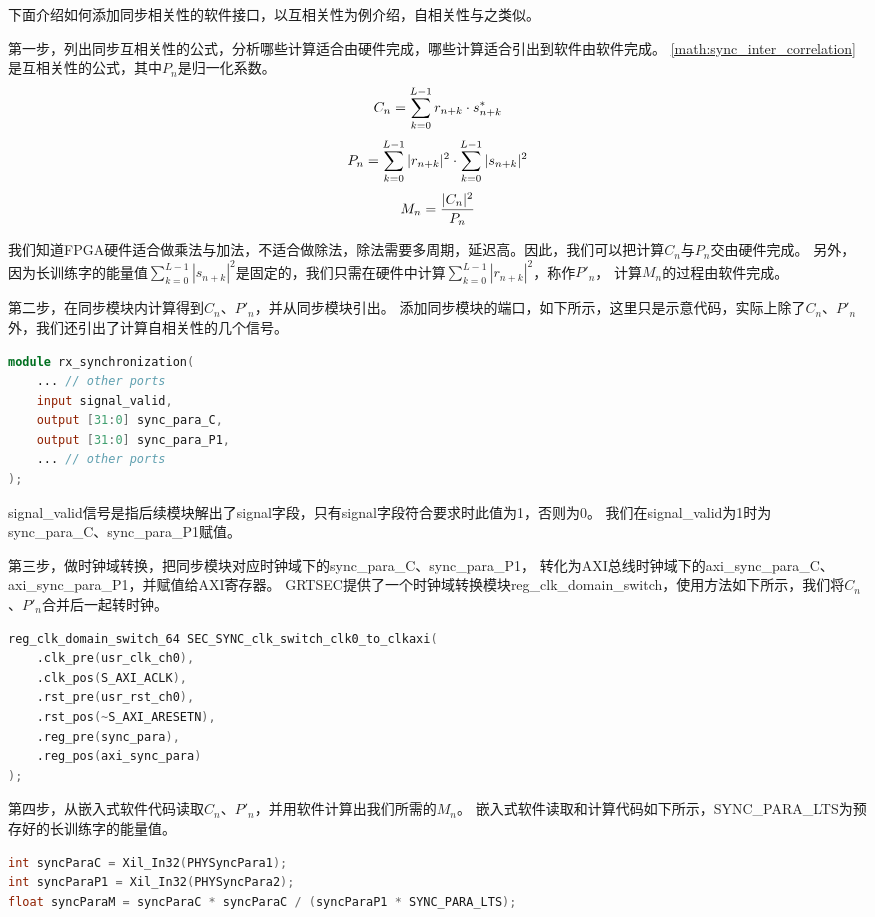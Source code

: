 		下面介绍如何添加同步相关性的软件接口，以互相关性为例介绍，自相关性与之类似。

		第一步，列出同步互相关性的公式，分析哪些计算适合由硬件完成，哪些计算适合引出到软件由软件完成。
		\ref{math:sync_inter_correlation}是互相关性的公式，其中$P_n$是归一化系数。
			\begin{equation}
				\centering
				C_n = \sum_{k=0}^{L-1} r_{n+k} \cdot s_{n+k}^*
			\end{equation}
			\begin{equation}
				\centering
				P_n = \sum_{k=0}^{L-1} |r_{n+k}|^2 \cdot \sum_{k=0}^{L-1} |s_{n+k}|^2
			\end{equation}
			\begin{equation}
				\centering
				M_n = \frac{|C_n|^2}{P_n}
				\label{math:sync_inter_correlation}
			\end{equation}

		我们知道FPGA硬件适合做乘法与加法，不适合做除法，除法需要多周期，延迟高。因此，我们可以把计算$C_n$与$P_n$交由硬件完成。
		另外，因为长训练字的能量值$\sum_{k=0}^{L-1} |s_{n+k}|^2$是固定的，我们只需在硬件中计算$\sum_{k=0}^{L-1} |r_{n+k}|^2$，称作$P'_n$，
		计算$M_n$的过程由软件完成。

		第二步，在同步模块内计算得到$C_n$、$P'_n$，并从同步模块引出。
		添加同步模块的端口，如下所示，这里只是示意代码，实际上除了$C_n$、$P'_n$外，我们还引出了计算自相关性的几个信号。
		\begin{lstlisting}[language={Verilog}]
module rx_synchronization(
	... // other ports
	input signal_valid,
	output [31:0] sync_para_C,
	output [31:0] sync_para_P1,
	... // other ports
);
		\end{lstlisting}
		signal\_valid信号是指后续模块解出了signal字段，只有signal字段符合要求时此值为1，否则为0。
		我们在signal\_valid为1时为sync\_para\_C、sync\_para\_P1赋值。

		第三步，做时钟域转换，把同步模块对应时钟域下的sync\_para\_C、sync\_para\_P1，
		转化为AXI总线时钟域下的axi\_sync\_para\_C、axi\_sync\_para\_P1，并赋值给AXI寄存器。
		GRTSEC提供了一个时钟域转换模块reg\_clk\_domain\_switch，使用方法如下所示，我们将$C_n$、$P'_n$合并后一起转时钟。
		\begin{lstlisting}[language={Verilog}]
reg_clk_domain_switch_64 SEC_SYNC_clk_switch_clk0_to_clkaxi(
	.clk_pre(usr_clk_ch0),
	.clk_pos(S_AXI_ACLK),
	.rst_pre(usr_rst_ch0),
	.rst_pos(~S_AXI_ARESETN),
	.reg_pre(sync_para),
	.reg_pos(axi_sync_para)
);
		\end{lstlisting}

		第四步，从嵌入式软件代码读取$C_n$、$P'_n$，并用软件计算出我们所需的$M_n$。
		嵌入式软件读取和计算代码如下所示，SYNC\_PARA\_LTS为预存好的长训练字的能量值。
		\begin{lstlisting}[language={C}]
int syncParaC = Xil_In32(PHYSyncPara1);
int syncParaP1 = Xil_In32(PHYSyncPara2);
float syncParaM = syncParaC * syncParaC / (syncParaP1 * SYNC_PARA_LTS);
		\end{lstlisting}

